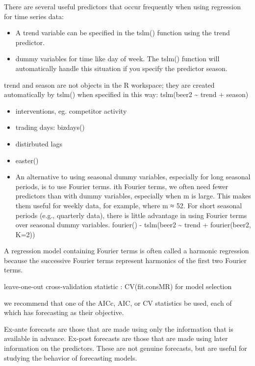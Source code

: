\documentclass[]{book}
\begin{document}
There are several useful predictors that occur frequently when using
regression for time series data:

\begin{itemize}
\item
  A trend variable can be specified in the tslm() function using the
  trend predictor.
\item
  dummy variables for time like day of week. The tslm() function will
  automatically handle this situation if you specify the predictor
  season.
\end{itemize}

trend and season are not objects in the R workspace; they are created
automatically by tslm() when specified in this way: tslm(beer2
\textasciitilde{} trend + season)

\begin{itemize}
\item
  interventions, eg. competitor activity
\item
  trading days: bizdays()
\item
  distirbuted lags
\item
  easter()
\item
  An alternative to using seasonal dummy variables, especially for long
  seasonal periods, is to use Fourier terms. ith Fourier terms, we often
  need fewer predictors than with dummy variables, especially when m is
  large. This makes them useful for weekly data, for example, where m ≈
  52. For short seasonal periods (e.g., quarterly data), there is little
  advantage in using Fourier terms over seasonal dummy variables.
  fourier() - tslm(beer2 \textasciitilde{} trend + fourier(beer2, K=2))
\end{itemize}

A regression model containing Fourier terms is often called a harmonic
regression because the successive Fourier terms represent harmonics of
the first two Fourier terms.

leave-one-out cross-validation statistic : CV(fit.consMR) for model
selection

we recommend that one of the AICc, AIC, or CV statistics be used, each
of which has forecasting as their objective.

Ex-ante forecasts are those that are made using only the information
that is available in advance. Ex-post forecasts are those that are made
using later information on the predictors. These are not genuine
forecasts, but are useful for studying the behavior of forecasting
models.
\end{document}
